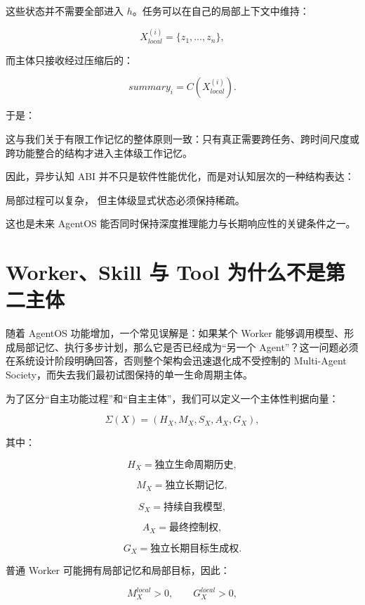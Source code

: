 这些状态并不需要全部进入 $h$。任务可以在自己的局部上下文中维持：

\[
X_{local}^{(i)}
=
\{z_1,\ldots,z_n\},
\]

而主体只接收经过压缩后的：

\[
summary_i
=
C(X_{local}^{(i)}).
\]

于是：

\begin{statementbox}
\centering
{}
\end{statementbox}

这与我们关于有限工作记忆的整体原则一致：只有真正需要跨任务、跨时间尺度或跨功能整合的结构才进入主体级工作记忆。

因此，异步认知 ABI 并不只是软件性能优化，而是对认知层次的一种结构表达：

\begin{statementbox}
局部过程可以复杂，
但主体级显式状态必须保持稀疏。
\end{statementbox}

这也是未来 AgentOS 能否同时保持深度推理能力与长期响应性的关键条件之一。

\section{Worker、Skill 与 Tool 为什么不是第二主体}

随着 AgentOS 功能增加，一个常见误解是：如果某个 Worker 能够调用模型、形成局部记忆、执行多步计划，那么它是否已经成为“另一个 Agent”？这一问题必须在系统设计阶段明确回答，否则整个架构会迅速退化成不受控制的 Multi-Agent Society，而失去我们最初试图保持的单一生命周期主体。

为了区分“自主功能过程”和“自主主体”，我们可以定义一个主体性判据向量：

\[
\Sigma(X)
=
(
H_X,
M_X,
S_X,
A_X,
G_X
),
\]

其中：

\[
H_X
=
\text{独立生命周期历史},
\]

\[
M_X
=
\text{独立长期记忆},
\]

\[
S_X
=
\text{持续自我模型},
\]

\[
A_X
=
\text{最终控制权},
\]

\[
G_X
=
\text{独立长期目标生成权}.
\]

普通 Worker 可能拥有局部记忆和局部目标，因此：

\[
M_X^{local}>0,
\qquad
G_X^{local}>0,
\]

